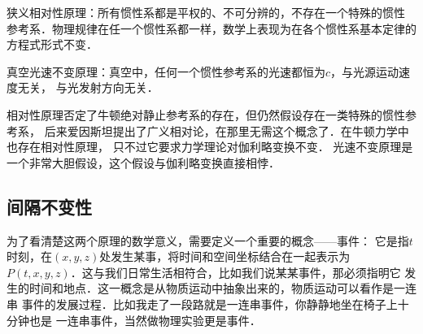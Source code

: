{\heiti 狭义相对性原理}：所有惯性系都是平权的、不可分辨的，不存在一个特殊的惯性
参考系．物理规律在任一个惯性系都一样，数学上表现为在各个惯性系基本定律的方程式形式不变．

{\heiti 真空光速不变原理}：真空中，任何一个惯性参考系的光速都恒为$c$，与光源运动速度无关，
与光发射方向无关．


相对性原理否定了牛顿绝对静止参考系的存在，但仍然假设存在一类特殊的惯性参考系，
后来爱因斯坦提出了广义相对论，在那里无需这个概念了．在牛顿力学中也存在相对性原理，
只不过它要求力学理论对伽利略变换不变．
光速不变原理是一个非常大胆假设，这个假设与伽利略变换直接相悖．


\subsection{间隔不变性}
为了看清楚这两个原理的数学意义，需要定义一个重要的概念——{\heiti 事件}：
它是指$t$时刻，在$(x,y,z)$处发生某事，将时间和空间坐标结合在一起表示为
$P(t,x,y,z)$．这与我们日常生活相符合，比如我们说某某事件，那必须指明它
发生的时间和地点．这一概念是从物质运动中抽象出来的，物质运动可以看作是一连串
事件的发展过程．比如我走了一段路就是一连串事件，你静静地坐在椅子上十分钟也是
一连串事件，当然做物理实验更是事件．

